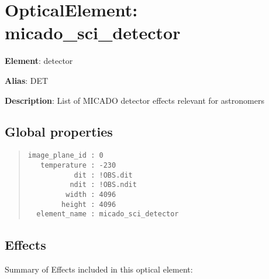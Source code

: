 

\section{OpticalElement: \textquotedbl{}micado\_sci\_detector\textquotedbl{}%
  \label{opticalelement-micado-sci-detector}%
}

\textbf{Element}: detector

\textbf{Alias}: DET

\textbf{Description}: List of MICADO detector effects relevant for astronomers


\subsection{Global properties%
  \label{global-properties}%
}

\begin{quote}
\begin{alltt}
\begin{lstlisting}[frame=single]
image_plane_id : 0
   temperature : -230
           dit : !OBS.dit
          ndit : !OBS.ndit
         width : 4096
        height : 4096
  element_name : micado_sci_detector
\end{lstlisting}
\end{alltt}
\end{quote}


\subsection{Effects%
  \label{effects}%
}

Summary of Effects included in this optical element:

